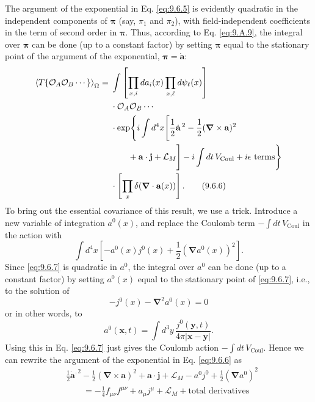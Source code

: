 The argument of the exponential in Eq. \eqref{eq:9.6.5} is evidently quadratic in the
independent components of $\boldsymbol\pi$ (say, $\pi_1$ and $\pi_2$), with
field-independent coefficients in the term of second order in
$\boldsymbol\pi$. Thus, according to Eq. \eqref{eq:9.A.9}, the integral over
$\boldsymbol\pi$ can be done (up to a constant factor) by setting
$\boldsymbol\pi$ equal to the stationary point of the argument of the
exponential, $\boldsymbol\pi=\dot{\mathbf a}$:
\begin{align}
\left\langle T\{\mathcal O_A\mathcal O_B\cdots\}\right\rangle_{\Omega}
={}&\int\left[\prod_{x,i}da_i(x)\prod_{x,\ell}d\psi_\ell(x)\right]
\notag\\
&\cdot\mathcal O_A\mathcal O_B\cdots
\notag\\
&\cdot\exp\Biggl\{i\int d^4x\Biggl[
 \frac12\dot{\mathbf a}^{\,2}
 -\frac12(\boldsymbol\nabla\times\mathbf a)^2
\notag\\
&\qquad+\mathbf a\cdot\mathbf j+\mathcal L_M\Biggr]
 -i\int dt\,V_{\mathrm{Coul}}+i\epsilon\text{ terms}\Biggr\}
\notag\\
&\cdot\left[\prod_x\delta(\boldsymbol\nabla\cdot\mathbf a(x))\right].
\tag{9.6.6}\label{eq:9.6.6}
\end{align}
To bring out the essential covariance of this result, we use a trick.
Introduce a new variable of integration $a^0(x)$, and replace the Coulomb term
$-\int dt\,V_{\mathrm{Coul}}$ in the action with
\begin{equation}
\int d^4x\left[-a^0(x)j^0(x)+\frac12
 (\boldsymbol\nabla a^0(x))^2\right].
\tag{9.6.7}\label{eq:9.6.7}
\end{equation}
Since \eqref{eq:9.6.7} is quadratic in $a^0$, the integral over $a^0$ can be done (up
to a constant factor) by setting $a^0(x)$ equal to the stationary point of
\eqref{eq:9.6.7}, i.e., to the solution of
\[
-j^0(x)-\boldsymbol\nabla^2a^0(x)=0
\]
or in other words, to
\begin{equation}
a^0(\mathbf{x},t)=\int d^3y\,
 \frac{j^0(\mathbf{y},t)}{4\pi|\mathbf{x}-\mathbf{y}|}.
\tag{9.6.8}\label{eq:9.6.8}
\end{equation}
Using this in Eq. \eqref{eq:9.6.7} just gives the Coulomb action
$-\int dt\,V_{\mathrm{Coul}}$. Hence we can rewrite the argument of the
exponential in Eq. \eqref{eq:9.6.6} as
\begin{align*}
&\frac12\dot{\mathbf a}^{,2}
 -\frac12(\boldsymbol\nabla\times\mathbf a)^2
 +\mathbf a\cdot\mathbf j+\mathcal L_M-a^0j^0
 +\frac12(\boldsymbol\nabla a^0)^2
\\
&\qquad=-\frac14f_{\mu\nu}f^{\mu\nu}+a_\mu j^\mu
 +\mathcal L_M+\text{total derivatives}
\end{align*}
